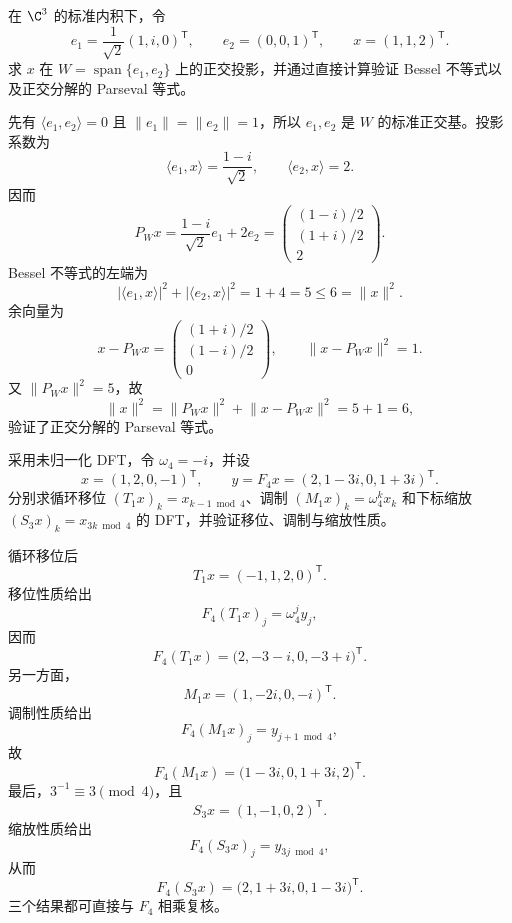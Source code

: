 \begin{exercise}[level=advanced]
在 $\C^3$ 的标准内积下，令
\[
e_1=\frac1{\sqrt2}(1,i,0)^{\mathsf T},\qquad
e_2=(0,0,1)^{\mathsf T},\qquad
x=(1,1,2)^{\mathsf T}.
\]
求 $x$ 在 $W=\operatorname{span}\{e_1,e_2\}$ 上的正交投影，并通过直接计算验证 Bessel 不等式以及正交分解的 Parseval 等式。
\begin{solution}
先有 $\langle e_1,e_2\rangle=0$ 且
$\lVert e_1\rVert=\lVert e_2\rVert=1$，所以 $e_1,e_2$ 是 $W$ 的标准正交基。投影系数为
\[
\langle e_1,x\rangle=\frac{1-i}{\sqrt2},
\qquad
\langle e_2,x\rangle=2.
\]
因而
\[
P_Wx
=\frac{1-i}{\sqrt2}e_1+2e_2
=\begin{pmatrix}(1-i)/2\\(1+i)/2\\2\end{pmatrix}.
\]
Bessel 不等式的左端为
\[
|\langle e_1,x\rangle|^2+|\langle e_2,x\rangle|^2
=1+4=5\le6=\lVert x\rVert^2.
\]
余向量为
\[
x-P_Wx
=\begin{pmatrix}(1+i)/2\\(1-i)/2\\0\end{pmatrix},
\qquad
\lVert x-P_Wx\rVert^2=1.
\]
又 $\lVert P_Wx\rVert^2=5$，故
\[
\lVert x\rVert^2
=\lVert P_Wx\rVert^2+\lVert x-P_Wx\rVert^2
=5+1=6,
\]
验证了正交分解的 Parseval 等式。
\end{solution}
\end{exercise}

\begin{exercise}[level=advanced]
采用未归一化 DFT，令 $\omega_4=-i$，并设
\[
x=(1,2,0,-1)^{\mathsf T},\qquad
y=F_4x=(2,1-3i,0,1+3i)^{\mathsf T}.
\]
分别求循环移位 $(T_1x)_k=x_{k-1\bmod4}$、调制
$(M_1x)_k=\omega_4^kx_k$ 和下标缩放 $(S_3x)_k=x_{3k\bmod4}$ 的 DFT，并验证移位、调制与缩放性质。
\begin{solution}
循环移位后
\[
T_1x=(-1,1,2,0)^{\mathsf T}.
\]
移位性质给出
\[
F_4(T_1x)_j=\omega_4^j y_j,
\]
因而
\[
F_4(T_1x)
=\bigl(2,-3-i,0,-3+i\bigr)^{\mathsf T}.
\]
另一方面，
\[
M_1x=(1,-2i,0,-i)^{\mathsf T}.
\]
调制性质给出
\[
F_4(M_1x)_j=y_{j+1\bmod4},
\]
故
\[
F_4(M_1x)
=\bigl(1-3i,0,1+3i,2\bigr)^{\mathsf T}.
\]
最后，$3^{-1}\equiv3\pmod4$，且
\[
S_3x=(1,-1,0,2)^{\mathsf T}.
\]
缩放性质给出
\[
F_4(S_3x)_j=y_{3j\bmod4},
\]
从而
\[
F_4(S_3x)
=\bigl(2,1+3i,0,1-3i\bigr)^{\mathsf T}.
\]
三个结果都可直接与 $F_4$ 相乘复核。
\end{solution}
\end{exercise}

